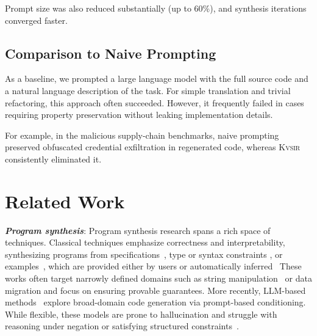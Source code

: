 \documentclass[sigplan,review,anonymous,10pt]{acmart}
\newcommand{\sys}{{\scshape Kv{\textalpha}sir}\xspace}
\newcommand{\heading}[1]{\vspace{2pt}\noindent\textbf{\emph{#1}}:\enspace}
\begin{document}
Prompt size was also reduced substantially (up to 60\%), and synthesis iterations converged faster.

\subsection{Comparison to Naive Prompting}

As a baseline, we prompted a large language model with the full source code and a natural language description of the task. For simple translation and trivial refactoring, this approach often succeeded. However, it frequently failed in cases requiring property preservation without leaking implementation details. 

For example, in the malicious supply-chain benchmarks, naive prompting preserved obfuscated credential exfiltration in regenerated code, whereas \sys consistently eliminated it.


\section{Related Work}

\heading{Program synthesis}
Program synthesis research spans a rich space of techniques.
Classical techniques emphasize correctness and
interpretability, synthesizing programs from specifications~\cite{alur2013syntax, feser2015synthesizing, gulwani2011automating,leino2016dafny},
type or syntax constraints \cite{polikarpova2016program,reynolds2019syguscomp},
or examples~\cite{jha2010oracle, raza2018disjunctive, singh2016blinkfill,wu2023programming},
which are provided either by users or automatically inferred~\cite{cambronero2019active,harp:ccs:2021}
These works often target narrowly
defined domains such as string manipulation~\cite{harp:ccs:2021} or data migration
\cite{yaghmazadeh2018automated} and focus on ensuring provable guarantees.
More recently, LLM-based methods~\cite{austin2021program, chen2021evaluating}
explore broad-domain code generation via prompt-based conditioning.
While flexible, these models are prone to hallucination and struggle
with reasoning under negation or satisfying structured constraints~\cite{xu2023llmfoolitselfpromptbased, wu2023deceptpromptexploitingllmdrivencode,jiang2024llmsdreamelephantswhen,hwang2024thinkpinkelephant}.
\end{document}
